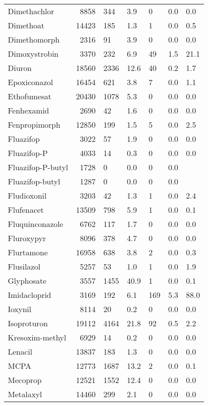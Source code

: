 \begin{longtable}{p{3cm}rR{1.4cm}R{1.4cm}R{1.4cm}R{1.4cm}R{1.4cm}}
  Dimethachlor & 8858 & 344 & 3.9 &  0 & 0.0 & 0.0 \\ 
  Dimethoat & 14423 & 185 & 1.3 &  1 & 0.0 & 0.5 \\ 
  Dimethomorph & 2316 & 91 & 3.9 &  0 & 0.0 & 0.0 \\ 
  Dimoxystrobin & 3370 & 232 & 6.9 & 49 & 1.5 & 21.1 \\ 
  Diuron & 18560 & 2336 & 12.6 & 40 & 0.2 & 1.7 \\ 
  Epoxiconazol & 16454 & 621 & 3.8 &  7 & 0.0 & 1.1 \\ 
  Ethofumesat & 20430 & 1078 & 5.3 &  0 & 0.0 & 0.0 \\ 
  Fenhexamid & 2690 & 42 & 1.6 &  0 & 0.0 & 0.0 \\ 
  Fenpropimorph & 12850 & 199 & 1.5 &  5 & 0.0 & 2.5 \\ 
  Fluazifop & 3022 & 57 & 1.9 &  0 & 0.0 & 0.0 \\ 
  Fluazifop-P & 4033 & 14 & 0.3 &  0 & 0.0 & 0.0 \\ 
  Fluazifop-P-butyl & 1728 &  0 & 0.0 &  0 & 0.0 &  \\ 
  Fluazifop-butyl & 1287 &  0 & 0.0 &  0 & 0.0 &  \\ 
  Fludioxonil & 3203 & 42 & 1.3 &  1 & 0.0 & 2.4 \\ 
  Flufenacet & 13509 & 798 & 5.9 &  1 & 0.0 & 0.1 \\ 
  Fluquinconazole & 6762 & 117 & 1.7 &  0 & 0.0 & 0.0 \\ 
  Fluroxypyr & 8096 & 378 & 4.7 &  0 & 0.0 & 0.0 \\ 
  Flurtamone & 16958 & 638 & 3.8 &  2 & 0.0 & 0.3 \\ 
  Flusilazol & 5257 & 53 & 1.0 &  1 & 0.0 & 1.9 \\ 
  Glyphosate & 3557 & 1455 & 40.9 &  1 & 0.0 & 0.1 \\ 
  Imidacloprid & 3169 & 192 & 6.1 & 169 & 5.3 & 88.0 \\ 
  Ioxynil & 8114 & 20 & 0.2 &  0 & 0.0 & 0.0 \\ 
  Isoproturon & 19112 & 4164 & 21.8 & 92 & 0.5 & 2.2 \\ 
  Kresoxim-methyl & 6929 & 14 & 0.2 &  0 & 0.0 & 0.0 \\ 
  Lenacil & 13837 & 183 & 1.3 &  0 & 0.0 & 0.0 \\ 
  MCPA & 12773 & 1687 & 13.2 &  2 & 0.0 & 0.1 \\ 
  Mecoprop & 12521 & 1552 & 12.4 &  0 & 0.0 & 0.0 \\ 
  Metalaxyl & 14460 & 299 & 2.1 &  0 & 0.0 & 0.0 \\ 

\end{longtable}
